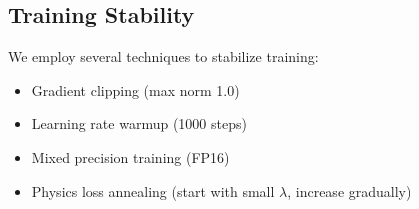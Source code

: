 
\subsection{Training Stability}

We employ several techniques to stabilize training:
\begin{itemize}
    \item Gradient clipping (max norm 1.0)
    \item Learning rate warmup (1000 steps)
    \item Mixed precision training (FP16)
    \item Physics loss annealing (start with small $\lambda$, increase gradually)
\end{itemize}

